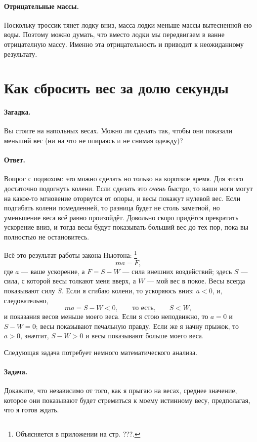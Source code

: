 \paragraph{Отрицательные массы.}
Поскольку троссик тянет лодку вниз, масса лодки меньше массы вытесненной ею воды.
Поэтому можно думать, что вместо лодки мы передвигаем в ванне отрицателную массу.
Именно эта отрицательность и приводит к неожиданному результату.

\section{Как сбросить вес за долю секунды}

\paragraph{Загадка.}
Вы стоите на напольных весах.
Можно ли сделать так, чтобы они показали меньший вес (ни на что не опираясь и не снимая одежду)?

\paragraph{Ответ.} Вопрос с подвохом: это можно сделать но только на короткое время.
Для этого достаточно подогнуть колени.
Если сделать это \emph{очень} быстро, то ваши ноги могут на какое-то мгновение оторвутся от опоры, и весы покажут нулевой вес.
Если подгибать колени помедленней, то разница будет не столь заметной, но уменьшение веса всё равно произойдёт.
Довольно скоро придётся прекратить ускорение вниз, и тогда весы будут показывать больший вес до тех пор, пока вы полностью не остановитесь.

Всё это результат работы закона Ньютона:%
\footnote{Объясняется в приложении на стр. ???.}
\[
ma = F,
\]
где $a$ --- ваше ускорение, а $F=S-W$ --- сила внешних воздействий;
здесь $S$ --- сила, с которой весы толкают меня вверх, а $W$ --- мой вес в покое.
Весы всегда показывают силу $S$.
Если я сгибаю колени, то ускоряюсь вниз: $a<0$, и, следовательно,
\[
ma = S - W < 0,
\qquad\text{то есть,}\qquad
S < W,
\]
и показания весов меньше моего веса.
Если я стою неподвижно, то $a=0$ и $S-W=0$; весы показывают печальную правду.
Если же я начну прыжок, то $a>0$, значтит, $S-W>0$ и весы показывают больше моего веса.

\medskip

Следующая задача потребует немного математического анализа.

\paragraph{Задача.}
Докажите, что независимо от того, как я прыгаю на весах, среднее значение, которое они показывают будет стремиться к моему истинному весу, предполагая, что я готов ждать.


